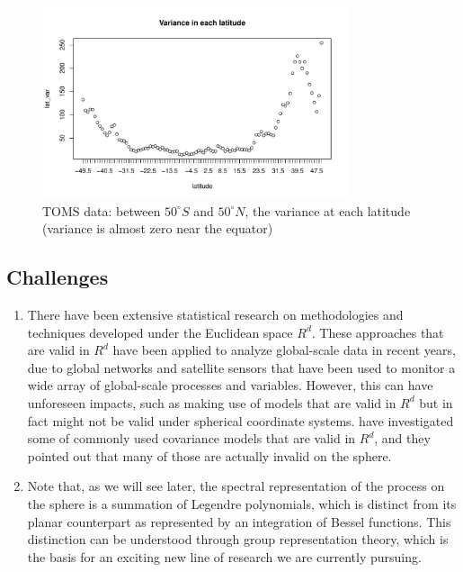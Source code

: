 \begin{figure}[H]
\centering
\includegraphics [width=0.8\textwidth, keepaspectratio]{graphs/TOMS_data_var_lat.pdf}
\caption{TOMS data: between $50^\circ S$ and $50^\circ N$, the variance at each latitude (variance is almost zero near the equator)}
\label{TOMS_data_var_lat}
\end{figure}

\subsection{Challenges}

\begin{enumerate}
\item There have been extensive statistical research on methodologies and techniques developed under the Euclidean space $R^d$. These approaches that are valid in $R^d$ have been applied to analyze global-scale data in recent years, due to global networks and satellite sensors that have been used to monitor a wide array of global-scale processes and variables. However, this can have unforeseen impacts, such as making use of models that are valid in $R^d$ but in fact might not be valid under spherical coordinate systems. \cite{HuangZhangRobeson2011} have investigated some of commonly used covariance models that are valid in $R^d$, and they pointed out that many of those are actually invalid on the sphere.
\item Note that, as we will see later, the spectral representation of the process on the sphere is a summation of Legendre polynomials, which is distinct from its planar counterpart as represented by an integration of Bessel functions. This distinction can be understood through group representation theory, which is the basis for an exciting new line of research we are currently pursuing.
\end{enumerate}

